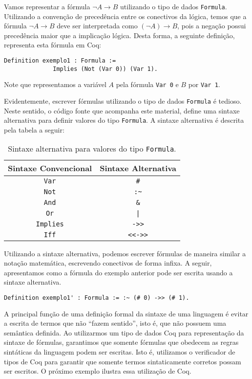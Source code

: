 \begin{Example}
Vamos representar a fórmula $\neg A \to B$ utilizando o tipo de dados
\texttt{Formula}. Utilizando a convenção de precedência entre os
conectivos da lógica, temos que a fórmula $\neg A \to B$ deve ser
interpretada como $(\neg A) \to B$, pois a negação possui precedência
maior que a implicação lógica. Desta forma, a seguinte definição,
representa esta fórmula em Coq:
\begin{lstlisting}
Definition exemplo1 : Formula :=
              Implies (Not (Var 0)) (Var 1).
\end{lstlisting}
Note que representamos a variável $A$ pela fórmula \texttt{Var 0} e
$B$ por \texttt{Var 1}.
\end{Example}

Evidentemente, escrever fórmulas utilizando o tipo de dados
\texttt{Formula} é tedioso. Neste sentido, o código fonte que
acompanha este material, define uma sintaxe alternativa para definir
valores do tipo \texttt{Formula}. A sintaxe alternativa é descrita
pela tabela a seguir:

\begin{table}[h]
  \begin{tabular}{|c|c|}
     \hline
         Sintaxe Convencional & Sintaxe Alternativa \\ \hline
         \texttt{Var}                 & \texttt{\#} \\
         \texttt{Not}                & \verb|:~| \\
         \texttt{And}                & \texttt{\&}\\
         \texttt{Or}                  & \texttt{|}\\
         \texttt{Implies}          & \texttt{->>}\\
         \texttt{Iff}                  & \texttt{<<->>}\\
     \hline
  \end{tabular}
  \centering
  \caption{Sintaxe alternativa para valores do tipo \texttt{Formula}.}
\end{table}
Utilizando a sintaxe alternativa, podemos escrever fórmulas de maneira
similar a notação matemática, escrevendo conectivos de forma infixa. A
seguir, apresentamos como a fórmula do exemplo anterior pode ser
escrita usando a sintaxe alternativa.
\begin{lstlisting}
Definition exemplo1' : Formula := :~ (# 0) ->> (# 1).
\end{lstlisting}
A principal função de uma definição formal da sintaxe de uma
linguagem é evitar a escrita de termos que não ``fazem sentido'', isto
é, que não possuem uma semântica definida. Ao utilizarmos um tipo de
dados Coq para representação da sintaxe de fórmulas, garantimos que
somente fórmulas que obedecem as regras sintáticas da linguagem podem
ser escritas. Isto é, utilizamos o verificador de tipos de Coq para
garantir que somente termos sintaticamente corretos possam ser
escritos. O próximo exemplo ilustra essa utilização de Coq.

